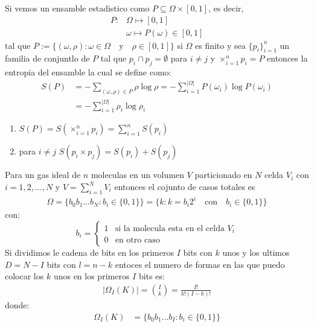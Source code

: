 \begin{answer}
    Si vemos un ensamble estadistico como $P\subseteq \Omega \times [0,1]$, es decir,
    \begin{align*}
        P: &\Omega \mapsto [0,1]\\
        &\omega \mapsto P(\omega) \in [0,1]
    \end{align*}
    tal que $P := \{(\omega,\rho): \omega \in \Omega \quad \text{y} \quad \rho \in [0,1]\}$ si $\Omega$ es finito y sea $\{p_i\}_{i=1}^n$ un familia de conjuntlo de $P$ tal que $p_i \cap p_ j = \emptyset$ para $i\neq j$ y ${\times}_{i=1}^n p_i = P$ entonces la entropia 
    del ensamble la cual se define como:
    \begin{align*}
        S(P) &= -\sum_{(\omega,\rho) \in P} \rho \log \rho = -\sum_{i = 1}^{|\Omega|} P(\omega_i) \log P(\omega_i)\\
        &= -\sum_{i = 1}^{|\Omega|} \rho_i \log \rho_i
    \end{align*} 
    \begin{enumerate}
        \item $S(P) = S\left(\times_{i=1}^n p_i\right) = \sum_{i=1}^n S(p_i)$
        \item para $i\neq j$ $S(p_i \times p_j) = S(p_i) + S(p_j)$
    \end{enumerate}
    Para un gas ideal de $n$ moleculas en un volumen $V$ particionado en $N$ celda $V_i$ con $i = 1,2,\dots,N$ y $V = \sum_{i=1}^N V_i$ entonces el cojunto de casos totales es 
    \begin{align*}
        \Omega = \{b_0b_1\dots b_N: b_i \in \{0,1\}\} = \{k: k = b_i 2^i \quad \text{con} \quad b_i \in \{0,1\}\}
    \end{align*}
    con:
    $$
     b_i = \begin{cases}
        1 & \text{si la molecula esta en el celda } V_i\\
        0 & \text{en otro caso}
    \end{cases}
    $$
    Si dividimos le cadena de bits en los primeros $I$ bits con $k$ unos y los ultimos $D = N - I$ bits con $l= n-k$ entoces el numero de formas en las que puedo colocar los $k$ unos en los primeros $I$ bits es:
    \begin{align*}
        |\Omega_I(K)|= \binom{I}{k} = \frac{I!}{k!(I-k)!}
    \end{align*}
    donde:
    \begin{align*}
        \Omega_I(K) &= \{b_0b_1 \dots b_I: b_i \in \{0,1\}\}\\

\end{align*}
\end{answer}
